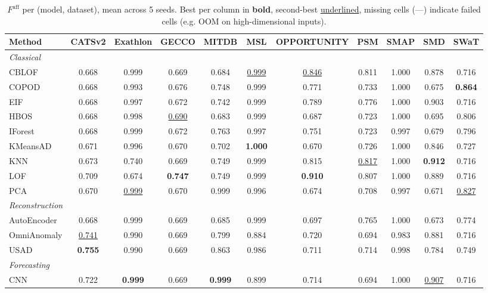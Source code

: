 \begin{table}[t]
\centering
\small
\caption{$F^{\text{aff}}$ per (model, dataset), mean across 5 seeds. Best per column in \textbf{bold}, second-best \underline{underlined}, missing cells (---) indicate failed cells (e.g. OOM on high-dimensional inputs).}
\label{tab:by-dataset-affiliation-f}
\begin{tabular}{lcccccccccc}
\toprule
Method & CATSv2 & Exathlon & GECCO & MITDB & MSL & OPPORTUNITY & PSM & SMAP & SMD & SWaT \\
\midrule
\multicolumn{11}{l}{\textit{Classical}} \\
CBLOF & 0.668 & 0.999 & 0.669 & 0.684 & \underline{0.999} & \underline{0.846} & 0.811 & 1.000 & 0.878 & 0.716 \\
COPOD & 0.668 & 0.993 & 0.676 & 0.748 & 0.999 & 0.771 & 0.733 & 1.000 & 0.675 & \textbf{0.864} \\
EIF & 0.668 & 0.997 & 0.672 & 0.742 & 0.999 & 0.789 & 0.776 & 1.000 & 0.903 & 0.716 \\
HBOS & 0.668 & 0.998 & \underline{0.690} & 0.683 & 0.999 & 0.687 & 0.723 & 1.000 & 0.695 & 0.806 \\
IForest & 0.668 & 0.999 & 0.672 & 0.763 & 0.997 & 0.751 & 0.723 & 0.997 & 0.679 & 0.796 \\
KMeansAD & 0.671 & 0.996 & 0.670 & 0.702 & \textbf{1.000} & 0.670 & 0.726 & 1.000 & 0.846 & 0.727 \\
KNN & 0.673 & 0.740 & 0.669 & 0.749 & 0.999 & 0.815 & \underline{0.817} & 1.000 & \textbf{0.912} & 0.716 \\
LOF & 0.709 & 0.674 & \textbf{0.747} & 0.749 & 0.999 & \textbf{0.910} & 0.807 & 1.000 & 0.889 & 0.716 \\
PCA & 0.670 & \underline{0.999} & 0.670 & 0.999 & 0.996 & 0.674 & 0.708 & 0.997 & 0.671 & \underline{0.827} \\
\midrule
\multicolumn{11}{l}{\textit{Reconstruction}} \\
AutoEncoder & 0.668 & 0.999 & 0.669 & 0.685 & 0.999 & 0.697 & 0.765 & 1.000 & 0.673 & 0.774 \\
OmniAnomaly & \underline{0.741} & 0.990 & 0.669 & 0.799 & 0.884 & 0.720 & 0.694 & 0.983 & 0.881 & 0.716 \\
USAD & \textbf{0.755} & 0.990 & 0.669 & 0.863 & 0.986 & 0.711 & 0.714 & 0.998 & 0.784 & 0.749 \\
\midrule
\multicolumn{11}{l}{\textit{Forecasting}} \\
CNN & 0.722 & \textbf{0.999} & 0.669 & \textbf{0.999} & 0.899 & 0.714 & 0.694 & 1.000 & \underline{0.907} & 0.716 \\

\end{tabular}
\end{table}

